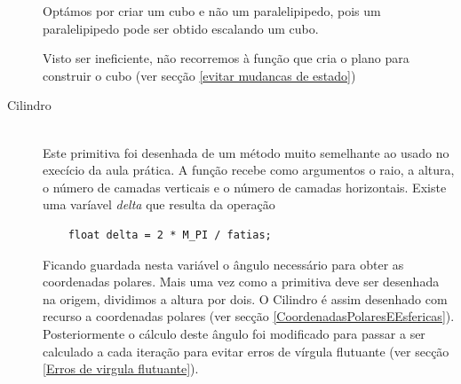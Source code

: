 \documentclass[a5paper,onecolumn, 11pt]{article}
\begin{document}
\begin{description}
	Optámos por criar um cubo e não um paralelipipedo, pois um paralelipipedo pode ser obtido escalando um cubo.
	
	Visto ser ineficiente, não recorremos à função que cria o plano para construir o cubo (ver secção \ref{evitar mudancas de estado})
	
	\item[Cilindro] \hfill \\
	Este primitiva foi desenhada de um método muito semelhante ao usado no execício da aula prática. A função recebe como argumentos o raio, a altura, o número de camadas verticais e o número de camadas horizontais. Existe uma varíavel \textit{delta} que resulta da operação
	\begin{verbatim}
	float delta = 2 * M_PI / fatias;
	\end{verbatim}
	Ficando guardada nesta variável o ângulo necessário para obter as coordenadas polares. Mais uma vez como a primitiva deve ser desenhada na origem, dividimos a altura por dois. O Cilindro é assim desenhado com recurso a coordenadas polares (ver secção \ref{CoordenadasPolaresEEsfericas}). Posteriormente o cálculo deste ângulo foi modificado para passar a ser calculado a cada iteração para evitar erros de vírgula flutuante (ver secção \ref{Erros de virgula flutuante}).


\end{description}
\end{document}
